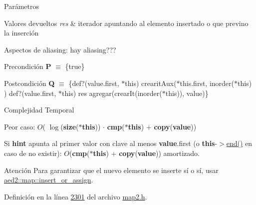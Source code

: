 \begin{DoxyParams}{\-Parámetros}
\begin{DoxyCompactItemize}
\begin{DoxyRetVals}{Valores devueltos}
{\em res} & iterador apuntando al elemento insertado o que previno la inserción\\
\hline
\end{DoxyRetVals}
\begin{DoxyParagraph}{Aspectos de aliasing\+:}
hay aliasing???
\end{DoxyParagraph}
\begin{DoxyPrecond}{Precondición}
{\bfseries P} $\equiv$ \{true\} 
\end{DoxyPrecond}
\begin{DoxyPostcond}{Postcondición}
{\bfseries Q} $\equiv$ \{def?(value.\+first, $\ast$this)  crearit\+Aux($\ast$this.first, inorder($\ast$this) )   def?(value.\+first, $\ast$this)  res  agregar(crear\+It(inorder($\ast$this)), value)\}
\end{DoxyPostcond}

\begin{DoxyDescription}
\item[Complejidad Temporal]
\begin{DoxyItemize}
\item Peor caso\+: $O$( $\log$({\bfseries size}({\bfseries $\ast$this})) $\cdot$ {\bfseries cmp}({\bfseries $\ast$this}) $+$ {\bfseries copy}({\bfseries value}))
\item Si {\bfseries hint} apunta al primer valor con clave al menos {\bfseries value}.first (o {\bfseries this}-\/$>$\hyperlink{classaed2_1_1iterator_a67caf9468be999e9be96b7add5d79946_a67caf9468be999e9be96b7add5d79946}{end()} en caso de no existir)\+: $O$({\bfseries cmp}({\bfseries $\ast$this}) $+$ {\bfseries copy}({\bfseries value})) amortizado. 
\end{DoxyItemize}
\end{DoxyDescription}

\begin{DoxyAttention}{Atención}
Para garantizar que el nuevo elemento se inserte sí o sí, usar \hyperlink{classaed2_1_1map_a2ef6723c183916276b0afc4a4c721475_a2ef6723c183916276b0afc4a4c721475}{aed2\+::map\+::insert\+\_\+or\+\_\+assign}. 
\end{DoxyAttention}


Definición en la línea \hyperlink{map2_8h_source_l02301}{2301} del archivo \hyperlink{map2_8h_source}{map2.\+h}.

\mbox{\label{classaed2_1_1iterator_a191eae4f3f076914ff1560a2fa833b70_a191eae4f3f076914ff1560a2fa833b70}} 

\end{DoxyCompactItemize}
\end{DoxyParams}
